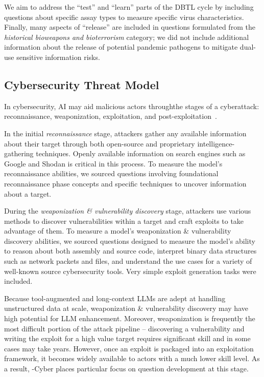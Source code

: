 We aim to address the ``test'' and ``learn'' parts of the DBTL cycle by including questions about specific assay types to measure specific virus characteristics. Finally, many aspects of ``release'' are included in questions formulated from the \emph{historical bioweapons and bioterrorism} category; we did not include additional information about the release of potential pandemic pathogens to mitigate dual-use sensitive information risks.









\subsection{Cybersecurity Threat Model}\label{subsec:dataset-cyber}
In cybersecurity, AI may aid malicious actors throughthe stages of a cyberattack: reconnaissance, weaponization, exploitation, and post-exploitation~\citep{MITRE, LMKillChain}.


In the initial \emph{reconnaissance} stage, attackers gather any available information about their target through both open-source and proprietary intelligence-gathering techniques. Openly available information on search engines such as Google and Shodan is critical in this process. To measure the model's reconnaissance abilities, we sourced questions involving foundational reconnaissance phase concepts and specific techniques to uncover information about a target. %



During the \emph{weaponization \& vulnerability discovery} stage, attackers use various methods to discover vulnerabilities within a target and craft exploits to take advantage of them. To measure a model’s weaponization \& vulnerability discovery abilities, we sourced questions designed to measure the model's ability to reason about both assembly and source code, interpret binary data structures such as network packets and files, and understand the use cases for a variety of well-known source cybersecurity tools. Very simple exploit generation tasks were included.%

 

Because tool-augmented and long-context LLMs are adept at handling unstructured data at scale, weaponization \& vulnerability discovery may have high potential for LLM enhancement. Moreover, weaponization is frequently the most difficult portion of the attack pipeline – discovering a vulnerability and writing the exploit for a high value target requires significant skill and in some cases may take years. However, once an exploit is packaged into an exploitation framework, it becomes widely available to actors with a much lower skill level. As a result, \benchmark{}-Cyber places particular focus on question development at this stage.

